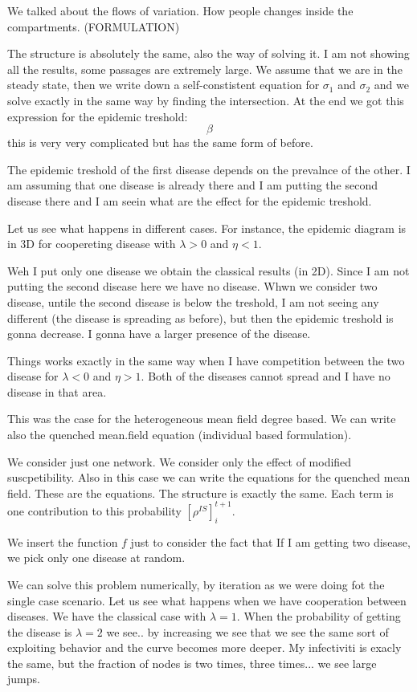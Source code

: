 \documentclass[../main/main.tex]{subfiles}
\begin{document}
We talked about the flows of variation. How people changes inside the compartments.
(FORMULATION)

The structure is absolutely the same, also the way of solving it. I am not showing all the results, some passages are extremely large. We assume that we are in the steady state, then we write down a self-constistent equation for \( \sigma _1 \) and \( \sigma _2 \) and we solve exactly in the same way by finding the intersection. At the end we got this expression for the epidemic treshold:
\begin{equation*}
  \beta
\end{equation*}
this is very very complicated but has the same form of before.

The epidemic treshold of the first disease depends on the prevalnce of the other. I am assuming that one disease is already there and I am putting the second disease there and I am seein what are the effect for the epidemic treshold.

Let us see what happens in different cases. For instance, the epidemic diagram is in 3D for coopereting disease with \( \lambda >0 \) and \( \eta <1 \).

Weh I put only one disease we obtain the classical results (in 2D). Since I am not putting the second disease here we have no disease. Whwn we consider two disease, untile the second disease is below the treshold, I am not seeing any different (the disease is spreading as before), but then the epidemic treshold is gonna decrease. I gonna have a larger presence  of the disease.


Things works exactly in the same way when I have competition between the two disease for \( \lambda <0 \) and \( \eta >1 \). Both of  the diseases cannot spread and I have no disease in that area.

This was the case for the heterogeneous mean field degree based. We can write also the quenched mean.field equation (individual based formulation).

We consider just one network. We consider only the effect of modified suscpetibility. Also in this case we can write the equations for the quenched mean field. These are the equations. The structure is exactly  the same. Each term is one contribution to this probability \( [\rho ^{IS}]^{t+1}_i \).

We insert the function \( f \) just to consider the fact that If I am getting two disease, we pick only one disease at random.

We can solve this problem numerically, by iteration as we were doing fot the single case scenario. Let us see what happens when we have  cooperation between diseases.
We have the classical case with \( \lambda =1 \). When the probability of getting the disease is \( \lambda =2 \) we see.. by increasing we see that we see the same sort of exploiting behavior and the curve becomes more deeper. My infectiviti is exacly the same, but the fraction of nodes is two times, three times... we see large jumps.
\end{document}
